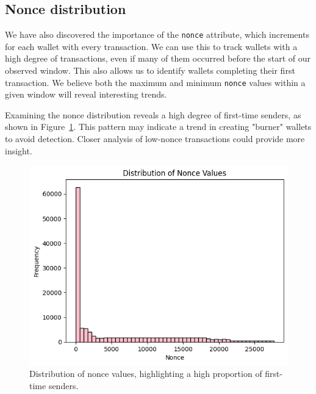 \documentclass[sigconf]{acmart}
\begin{document}
\subsection{Nonce distribution}
We have also discovered the importance of the \texttt{nonce} attribute, which increments for each wallet with every transaction. We can use this to track wallets with a high degree of transactions, even if many of them occurred before the start of our observed window. This also allows us to identify wallets completing their first transaction. We believe both the maximum and minimum \texttt{nonce} values within a given window will reveal interesting trends.

Examining the nonce distribution reveals a high degree of first-time senders, as shown in Figure~\ref{fig:nonceDistro}. This pattern may indicate a trend in creating "burner" wallets to avoid detection. Closer analysis of low-nonce transactions could provide more insight.

\begin{figure}[H]
    \centering
    \includegraphics[width=0.8\linewidth]{M4-nonce-distro.png}
    \caption{Distribution of nonce values, highlighting a high proportion of first-time senders.}
    \label{fig:nonceDistro}
\end{figure}



 
\end{document}
